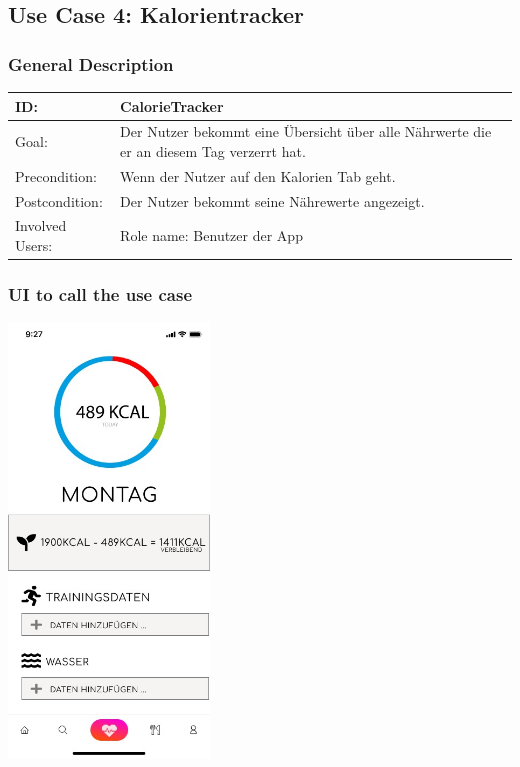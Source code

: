 \documentclass[12pt]{article}
\theoremstyle{definition}
\begin{document}
\subsection{Use Case 4: Kalorientracker}

\subsubsection{General Description}

\begin{tabular}{|p{.2\linewidth}|p{.65\linewidth}|}
\hline 
ID: & CalorieTracker \\ \hline
Goal: & Der Nutzer bekommt eine Übersicht über alle Nährwerte die er an diesem Tag verzerrt hat.\\ \hline
Precondition: & Wenn der Nutzer auf den Kalorien Tab geht. \\ \hline
Postcondition: & Der Nutzer bekommt seine Nährewerte angezeigt. \\ \hline
Involved Users: &Role name: Benutzer der App \\ \hline
\end{tabular}

\subsubsection{UI to call the use case}

\begin{center}
    \includegraphics[width=0.4\textwidth]{res/images/CalorieDashboard.jpeg}
\end{center}
\end{document}

